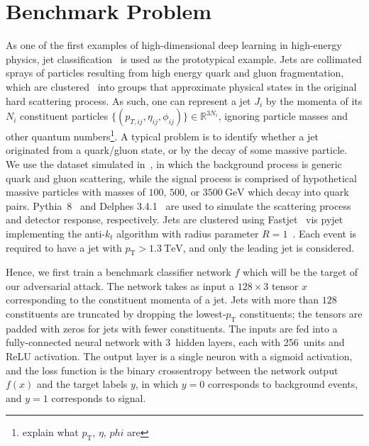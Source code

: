 \documentclass[reprint,nofootinbib,...]{revtex4-1}
\newcommand{\nconst}{128}       %
\newcommand{\nlayerCLS}{3}     %
\newcommand{\nunitsCLS}{256} %
\newcommand{\pt}{p_\mathrm{T}} %
\begin{document}
\section{Benchmark Problem}

As one of the first examples of high-dimensional deep learning in high-energy physics, jet classification~\cite{Larkoski:2017jix} is used as the prototypical example.
Jets are collimated sprays of particles resulting from high energy quark and gluon fragmentation, which are clustered~\cite{Cacciari:2008gp} into groups that approximate physical states in the original hard scattering process.
As such, one can represent a jet $J_i$ by the momenta of its $N_i$ constituent particles $\{(p_{T,ij},\eta_{ij},\phi_{ij})\}\in\mathbb{R}^{3N_i}$, ignoring particle masses and other quantum numbers\footnote{explain what $p_\mathrm{T}$, $\eta$, $phi$ are}.
A typical problem is to identify whether a jet originated from a quark/gluon state, or by the decay of some massive particle.
We use the dataset simulated in~\cite{gregor_kasieczka_2019_2629073}, in which the background process is generic quark and gluon scattering, while the signal process is comprised of hypothetical massive particles with masses of $100$, $500$, or $3500\ \mathrm{GeV}$ which decay into quark pairs.
Pythia~8~\cite{Sjostrand:2006za,Sjostrand:2007gs} and Delphes 3.4.1~\cite{deFavereau:2013fsa} are used to simulate the scattering process and detector response, respectively.
Jets are clustered using Fastjet~\cite{Cacciari:2011ma,Cacciari:2005hq} vis pyjet~\cite{noel_dawe_2019_2672944} implementing the anti-$k_t$ algorithm with radius parameter $R=1$~\cite{Cacciari:2008gp}.
Each event is required to have a jet with $p_\mathrm{T} > 1.3\ \mathrm{TeV}$, and only the leading jet is considered.

Hence, we first train a benchmark classifier network $f$ which will be the target of our adversarial attack.
The network takes as input a $\nconst\times3$ tensor $x$ corresponding to the constituent momenta of a jet.
Jets with more than $\nconst$ constituents are truncated by dropping the lowest-$\pt$ constituents; the tensors are padded with zeros for jets with fewer constituents.
The inputs are fed into a fully-connected neural network with \nlayerCLS\ hidden layers, each with \nunitsCLS\ units and ReLU activation.
The output layer is a single neuron with a sigmoid activation, and the loss function is the binary crossentropy between the network output $f(x)$ and the target labels $y$, in which $y=0$ corresponds to background events, and $y=1$ corresponds to signal.
\end{document}
